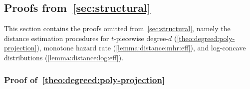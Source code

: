\subsection{Proofs from~\cref{sec:structural}}\label{app:structural:projection:proofs}

This section contains the proofs omitted from~\cref{sec:structural}, namely the distance estimation procedures for $t$-piecewise degree-$d$ (\cref{theo:degreed:poly-projection}), monotone hazard rate (\cref{lemma:distance:mhr:eff}), and log-concave distributions (\cref{lemma:distance:log:eff}).

\subsubsection{Proof of~\cref{theo:degreed:poly-projection}}\label{app:structural:projection:proofs:degreed}

